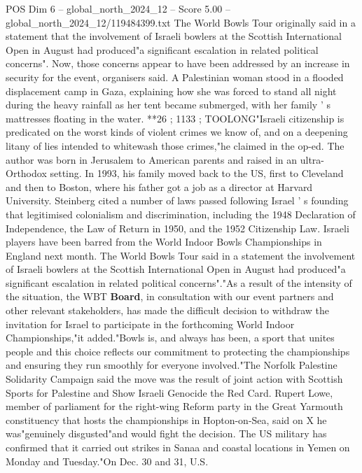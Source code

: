 \begin{textsample}{POS Dim 6 – global\_north\_2024\_12 – Score 5.00 – global\_north\_2024\_12/119484399.txt}  \label{ex:f6_pos_267}
The World Bowls Tour originally said in a statement that the involvement of Israeli bowlers at the Scottish International Open in August had produced"a significant escalation in related political concerns".
Now, those concerns appear to have been addressed by an increase in security for the event, organisers said.
A Palestinian woman stood in a flooded displacement camp in Gaza, explaining how she was forced to stand all night during the heavy rainfall as her tent became submerged, with her family ' s mattresses floating in the water. **26 ; 1133 ; TOOLONG"Israeli citizenship is predicated on the worst kinds of violent crimes we know of, and on a deepening litany of lies intended to whitewash those crimes,"he claimed in the op-ed.
The author was born in Jerusalem to American parents and raised in an ultra-Orthodox setting.
In 1993, his family moved back to the US, first to Cleveland and then to Boston, where his father got a job as a director at Harvard University.
Steinberg cited a number of laws passed following Israel ' s founding that legitimised colonialism and discrimination, including the 1948 Declaration of Independence, the Law of Return in 1950, and the 1952 Citizenship Law.
Israeli players have been barred from the World Indoor Bowls Championships in England next month.
The World Bowls Tour said in a statement the involvement of Israeli bowlers at the Scottish International Open in August had produced"a significant escalation in related political concerns"."As a result of the intensity of the situation, the WBT \textbf{Board}, in consultation with our event partners and other relevant stakeholders, has made the difficult decision to withdraw the invitation for Israel to participate in the forthcoming World Indoor Championships,"it added."Bowls is, and always has been, a sport that unites people and this choice reflects our commitment to protecting the championships and ensuring they run smoothly for everyone involved."The Norfolk Palestine Solidarity Campaign said the move was the result of joint action with Scottish Sports for Palestine and Show Israeli Genocide the Red Card.
Rupert Lowe, member of parliament for the right-wing Reform party in the Great Yarmouth constituency that hosts the championships in Hopton-on-Sea, said on X he was"genuinely disgusted"and would fight the decision.
The US military has confirmed that it carried out strikes in Sanaa and coastal locations in Yemen on Monday and Tuesday."On Dec. 30 and 31, U.S.

\end{textsample}
